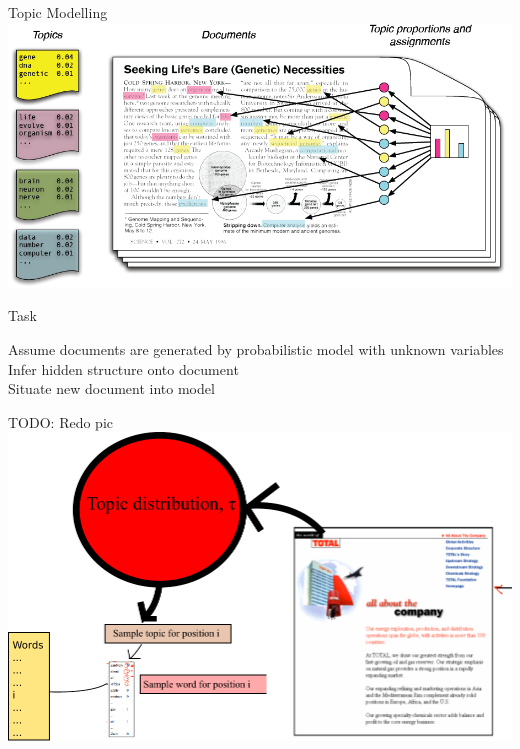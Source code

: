 \documentclass{lecture}
\begin{document}
\begin{plain}{Topic Modelling}
\includegraphics[scale=0.35]{figs/blei}
\end{plain}

\begin{plain}{Task}
\begin{itemize}
	\p Assume documents are generated by probabilistic model with unknown variables\\
	\p Infer hidden structure onto document\\
	\p Situate new document into model\\
\end{itemize}
TODO: Redo pic
\includegraphics[scale=0.4]{figs/steps}
\end{plain}
\end{document}
